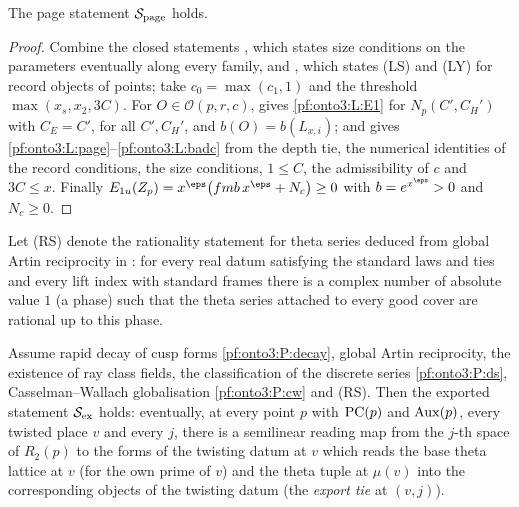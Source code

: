\begin{proposition}\label{pf:onto3:page}
The page statement $\mathcal{S}_{\mathrm{page}}$ holds.
\end{proposition}

\begin{proof}
Combine the closed statements , which
states size conditions on the parameters eventually along every family, and
, which states (LS) and (LY) for record objects of points; take
$c_0=\max(c_1,1)$ and the threshold $\max(x_s,x_2,3C)$. For $O\in\mathcal O(p,r,c)$,
 gives \ref{pf:onto3:L:E1} for
$N_p(C',C_H')$ with $C_E=C'$, for all $C',C_H'$, and $b(O)=b(L_{x,i})$; and
 gives \ref{pf:onto3:L:page}--\ref{pf:onto3:L:badc} from the
depth tie, the numerical identities of the record conditions, the size conditions, $1\le C$, the admissibility of
$c$ and $3C\le x$. Finally $E_{1u}(Z_p)=x^{\eps}\bigl(fmb\,x^{\eps}+N_c\bigr)\ge0$ with $b=e^{x^\eps}>0$ and
$N_c\ge0$.
\end{proof}

Let (RS) denote the rationality statement for theta series deduced from global Artin reciprocity in
: for every real datum satisfying the standard laws
and ties and every lift index with standard frames there is a complex number of absolute value $1$ (a phase) such
that the theta series attached to every good cover are rational up to this phase.

\begin{proposition}\label{pf:onto3:export}
Assume rapid decay of cusp forms \ref{pf:onto3:P:decay}, global Artin reciprocity, the existence of ray class
fields, the classification of the discrete series \ref{pf:onto3:P:ds}, Casselman--Wallach globalisation
\ref{pf:onto3:P:cw} and (RS). Then the exported statement $\mathcal{S}_{\mathrm{ex}}$ holds: eventually, at every point $p$
with $\mathrm{PC}(p)$ and $\mathrm{Aux}(p)$, every twisted place $v$ and every $j$, there is a semilinear reading
map from the $j$-th space of $R_2(p)$ to the forms of the twisting datum at $v$ which reads the base theta lattice
at $v$ (for the own prime of $v$) and the theta tuple at $\mu(v)$ into the corresponding objects of the twisting
datum (the \emph{export tie} at $(v,j)$).
\end{proposition}

